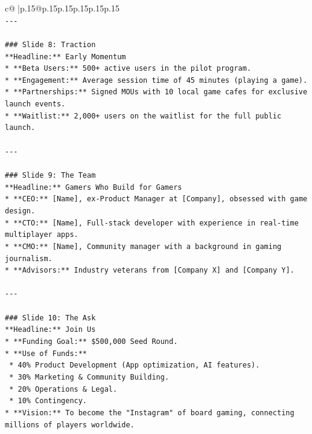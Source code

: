 \documentclass{article}
\begin{document}
{\begin{supertabular}{c@{$\;$}|p{.15\linewidth}@{}p{.15\linewidth}p{.15\linewidth}p{.15\linewidth}p{.15\linewidth}p{.15\linewidth}}
{{{\\ 
\texttt{{-}{-}{-}} \\
\\ 
\texttt{\#\#\# Slide 8: Traction} \\
\texttt{**Headline:** Early Momentum} \\
\texttt{*   **Beta Users:** 500+ active users in the pilot program.} \\
\texttt{*   **Engagement:** Average session time of 45 minutes (playing a game).} \\
\texttt{*   **Partnerships:** Signed MOUs with 10 local game cafes for exclusive launch events.} \\
\texttt{*   **Waitlist:** 2,000+ users on the waitlist for the full public launch.} \\
\\ 
\texttt{{-}{-}{-}} \\
\\ 
\texttt{\#\#\# Slide 9: The Team} \\
\texttt{**Headline:** Gamers Who Build for Gamers} \\
\texttt{*   **CEO:** {[}Name{]}, ex{-}Product Manager at {[}Company{]}, obsessed with game design.} \\
\texttt{*   **CTO:** {[}Name{]}, Full{-}stack developer with experience in real{-}time multiplayer apps.} \\
\texttt{*   **CMO:** {[}Name{]}, Community manager with a background in gaming journalism.} \\
\texttt{*   **Advisors:** Industry veterans from {[}Company X{]} and {[}Company Y{]}.} \\
\\ 
\texttt{{-}{-}{-}} \\
\\ 
\texttt{\#\#\# Slide 10: The Ask} \\
\texttt{**Headline:** Join Us} \\
\texttt{*   **Funding Goal:** \$500,000 Seed Round.} \\
\texttt{*   **Use of Funds:**} \\
\texttt{    *   40\% Product Development (App optimization, AI features).} \\
\texttt{    *   30\% Marketing \& Community Building.} \\
\texttt{    *   20\% Operations \& Legal.} \\
\texttt{    *   10\% Contingency.} \\
\texttt{*   **Vision:** To become the "Instagram" of board gaming, connecting millions of players worldwide.} \\
}}}
\end{supertabular}}
\end{document}
